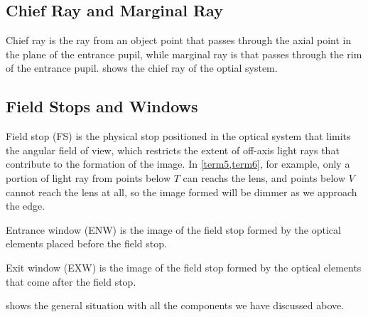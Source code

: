 \documentclass[english,a4paper,12pt]{report}
\begin{document}

\subsection{Chief Ray and Marginal Ray}

Chief ray is the ray from an object point that passes through the axial point in the plane of the entrance pupil, while marginal ray is that passes through the rim of the entrance pupil.  shows the chief ray of the optial system.

\subsection{Field Stops and Windows}

Field stop (FS) is the physical stop positioned in the optical system that limits the angular field of view, which restricts the extent of off-axis light rays that contribute to the formation of the image. In \cref{term5,term6}, for example, only a portion of light ray from points below \(T\) can reachs the lens, and points below \(V\) cannot reach the lens at all, so the image formed will be dimmer as we approach the edge. 

Entrance window (ENW) is the image of the field stop formed by the optical elements placed before the field stop.

Exit window (EXW) is the image of the field stop formed by the optical elements that come after the field stop.



 shows the general situation with all the components we have discussed above.

\end{document}
